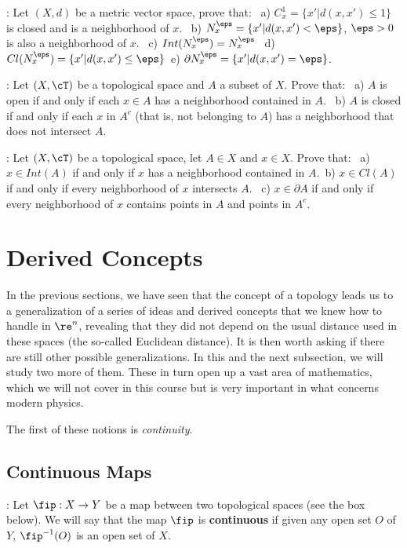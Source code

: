\ejer: Let $(X,d)$ be a metric vector space, prove that: \ a) $C^1_x = \{x'| d(x,x') \leq 1 \}$ is closed and is a neighborhood of $x$. \ b) $N^{\eps}_x = \{x' | d(x,x') < \eps \}$, $\eps >0$ is also a neighborhood of $x$. \ c) $Int(N^{\eps}_x) = N^{\eps}_x$ \ d) $Cl(N^{\eps}_x) = \{x' | d(x,x') \leq \eps \} $\ e) $\partial N^{\eps}_x = \{x' | d(x,x') = \eps \}$.

\ejer: Let $(X,\cT)$ be a topological space and $A$ a subset of $X$. Prove that: \ a) $A$ is open if and only if each $x \in A$ has a neighborhood contained in $A$. \ b) $A$ is closed if and only if each $x$ in $A^c$ (that is, not belonging to $A$) has a neighborhood that does not intersect $A$.

\ejer: Let $(X,\cT)$ be a topological space, let $A \in X$ and $x \in X$. Prove that: \ a) $x \in Int(A)$ if and only if $x$ has a neighborhood contained in $A$.\ b) $x \in Cl(A)$ if and only if every neighborhood of $x$ intersects $A$. \ c) $x \in \partial A$ if and only if every neighborhood of $x$ contains points in $A$ and points in $A^c$.

\section{Derived Concepts}

In the previous sections, we have seen that the concept of a topology leads us to a generalization of a series of ideas and derived concepts that we knew how to handle in $\re^n$, revealing that they did not depend on the usual distance used in these spaces (the so-called Euclidean distance). It is then worth asking if there are still other possible generalizations. In this and the next subsection, we will study two more of them. These in turn open up a vast area of mathematics, which we will not cover in this course but is very important in what concerns modern physics.

The first of these notions is \textit{continuity}.

\subsection{Continuous Maps}

: Let $\fip :X \rightarrow Y$ be a map between two topological spaces (see the box below). We will say that the map $\fip$ is {\bf continuous} if given any open set $O$ of $Y$, $\fip^{-1}(O)$ is an open set of $X$.

\espa %

